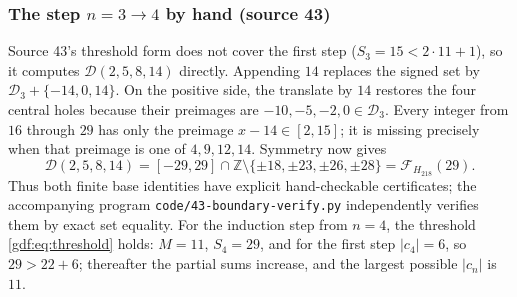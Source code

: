 \documentclass[11pt,a4paper]{article}
\numberwithin{equation}{section}
\theoremstyle{definition}
\theoremstyle{remark}
\theoremstyle{plain}
\newcommand{\Z}{\mathbb Z}
\newcommand{\cD}{\mathcal D}
\newcommand{\cF}{\mathcal F}
\newcommand{\file}[1]{\nolinkurl{#1}}
\newcommand{\src}[1]{\textup{(source #1)}}
\begin{document}
\subsubsection*{The step $n=3\to4$ by hand \src{43}}

Source 43's threshold form does not cover the first step ($S_3=15<2\cdot11+1$),
so it computes $\cD(2,5,8,14)$ directly.  Appending $14$ replaces the signed
set by $\cD_3+\{-14,0,14\}$.  On the positive side, the translate by $14$
restores the four central holes because their preimages are
$-10,-5,-2,0\in\cD_3$.  Every integer from $16$ through $29$ has only the
preimage $x-14\in[2,15]$; it is missing precisely when that preimage is one of
$4,9,12,14$.  Symmetry now gives
\begin{equation}\label{gdf:eq:v-base4}
 \cD(2,5,8,14)
 =[-29,29]\cap\Z\setminus
 \{\pm18,\pm23,\pm26,\pm28\}
 =\cF_{H_{218}}(29).
\end{equation}
Thus both finite base identities have explicit hand-checkable certificates;
the accompanying program \file{code/43-boundary-verify.py} independently
verifies them by exact set equality.  For the induction step from $n=4$, the
threshold \eqref{gdf:eq:threshold} holds: $M=11$, $S_4=29$, and for the first
step $|c_4|=6$, so $29>22+6$; thereafter the partial sums increase, and the
largest possible $|c_n|$ is $11$.
\end{document}
